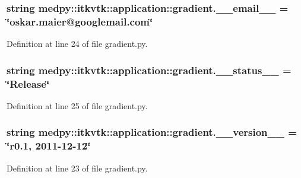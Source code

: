 \hypertarget{namespacemedpy_1_1itkvtk_1_1application_1_1gradient_a65a22f3617c778551fa3911c60b82ed6}{
\subsubsection[{\_\-\_\-email\_\-\_\-}]{\setlength{\rightskip}{0pt plus 5cm}string {\bf medpy::itkvtk::application::gradient.\_\-\_\-email\_\-\_\-} = \char`\"{}oskar.maier@googlemail.com\char`\"{}}}
\label{namespacemedpy_1_1itkvtk_1_1application_1_1gradient_a65a22f3617c778551fa3911c60b82ed6}


Definition at line 24 of file gradient.py.

\hypertarget{namespacemedpy_1_1itkvtk_1_1application_1_1gradient_a22567d9ffa205e4546e50f1ee5162859}{
\subsubsection[{\_\-\_\-status\_\-\_\-}]{\setlength{\rightskip}{0pt plus 5cm}string {\bf medpy::itkvtk::application::gradient.\_\-\_\-status\_\-\_\-} = \char`\"{}Release\char`\"{}}}
\label{namespacemedpy_1_1itkvtk_1_1application_1_1gradient_a22567d9ffa205e4546e50f1ee5162859}


Definition at line 25 of file gradient.py.

\hypertarget{namespacemedpy_1_1itkvtk_1_1application_1_1gradient_a4eda595d2c8ce8a62c59b1f464b8cf61}{
\subsubsection[{\_\-\_\-version\_\-\_\-}]{\setlength{\rightskip}{0pt plus 5cm}string {\bf medpy::itkvtk::application::gradient.\_\-\_\-version\_\-\_\-} = \char`\"{}r0.1, 2011-\/12-\/12\char`\"{}}}
\label{namespacemedpy_1_1itkvtk_1_1application_1_1gradient_a4eda595d2c8ce8a62c59b1f464b8cf61}


Definition at line 23 of file gradient.py.

